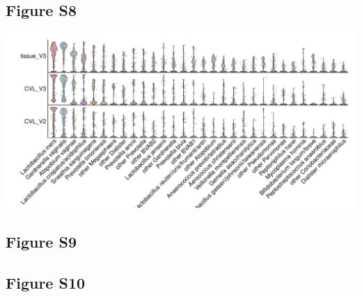 \documentclass[
]{article}
\begin{document}
\clearpage

\hypertarget{figure-s8}{%
\subsection{Figure S8}\label{figure-s8}}

\includegraphics[width=1\linewidth]{manuscript_template_files/figure-latex/unnamed-chunk-18-1}

\clearpage

\hypertarget{figure-s9}{%
\subsection{Figure S9}\label{figure-s9}}

\clearpage

\hypertarget{figure-s10}{%
\subsection{Figure S10}\label{figure-s10}}
\end{document}
